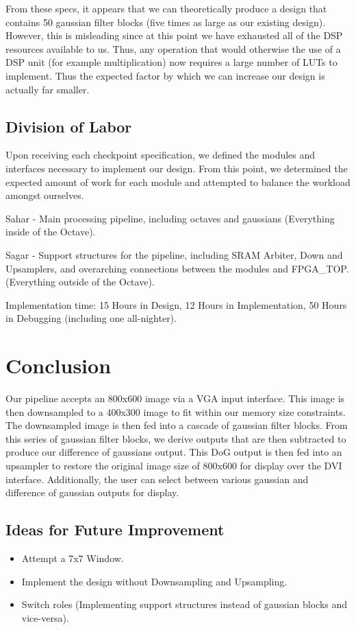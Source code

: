 From these specs, it appears that we can theoretically produce a design that contains 50 gaussian filter blocks (five times as large as
our existing design). However, this is misleading since at this point we have exhausted all of the 
DSP resources available to us. Thus, any operation that would otherwise the use of a DSP unit (for example
multiplication) now requires a large number of LUTs to implement. Thus the expected factor
by which we can increase our design is actually far smaller.

\subsection{Division of Labor}

Upon receiving each checkpoint specification, we defined the modules and interfaces
necessary to implement our design. From this point, we determined the expected 
amount of work for each module and attempted to balance the workload amongst ourselves.

Sahar - Main processing pipeline, including octaves and gaussians (Everything inside of the Octave).

Sagar - Support structures for the pipeline, including SRAM Arbiter, Down and Upsamplers, and
overarching connections between the modules and FPGA\_TOP. (Everything outside of the Octave).

Implementation time: 15 Hours in Design, 12 Hours in Implementation, 50 Hours in Debugging (including one all-nighter).

\section{Conclusion}

Our pipeline accepts an 800x600 image via a VGA input interface. This image 
is then downsampled to a 400x300 image to fit within our memory size constraints. 
The downsampled image is then fed into a cascade of gaussian filter blocks. From this
series of gaussian filter blocks, we derive outputs that are then subtracted to 
produce our difference of gaussians output. This DoG output is then fed into 
an upsampler to restore the original image size of 800x600 for display over
the DVI interface. Additionally, the user can select between various gaussian and 
difference of gaussian outputs for display.

\subsection{Ideas for Future Improvement}

\begin{itemize}
    \item Attempt a 7x7 Window.
    \item Implement the design without Downsampling and Upsampling.
    \item Switch roles (Implementing support structures instead of gaussian blocks and vice-versa).
\end{itemize}


